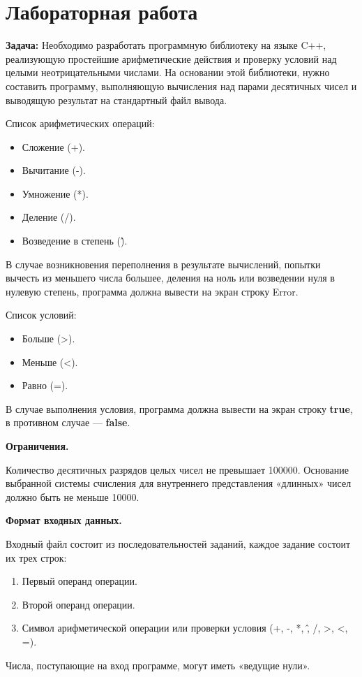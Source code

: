 \documentclass[pdf, unicode, 12pt, a4paper,oneside,fleqn]{article}
\newcommand{\CWHeader}[1]{\section*{#1}}
\newcommand{\CWProblem}[1]{\par\textbf{Задача: }#1}
\begin{document}
\CWHeader{Лабораторная работа }
\setcounter{page}{1}
\CWProblem{ 
Необходимо разработать программную библиотеку на языке C++, реализующую простейшие арифметические действия и проверку условий над целыми неотрицательными числами. На основании этой библиотеки, нужно составить программу, выполняющую вычисления над парами десятичных чисел и выводящую результат на стандартный файл вывода.

Список арифметических операций: 
{\begin{itemize}
    \item Сложение (+).
    \item Вычитание (-).
    \item Умножение (*).
    \item Деление (/).
    \item Возведение в степень (\^).
\end{itemize}}

В случае возникновения переполнения в результате вычислений, попытки вычесть из меньшего числа большее, деления на ноль или возведении нуля в нулевую степень, программа должна вывести на экран строку Error.

Список условий:
\begin{itemize}
    \item Больше (>).
    \item Меньше (<).
    \item Равно (=).
\end{itemize}

В случае выполнения условия, программа должна вывести на экран строку {\bf true}, в противном случае — {\bf false}.

{\bf Ограничения.}

Количество десятичных разрядов целых чисел не превышает 100000. Основание выбранной системы счисления для внутреннего представления «длинных» чисел должно быть не меньше 10000.

{\bf Формат входных данных.}

Входный файл состоит из последовательностей заданий, каждое задание состоит их трех строк:
\begin{enumerate}
    \item Первый операнд операции.
    \item Второй операнд операции.
    \item Символ арифметической операции или проверки условия (+, -, *, \^, /, >, <, =).
\end{enumerate}

Числа, поступающие на вход программе, могут иметь «ведущие нули».

}
\end{document}
